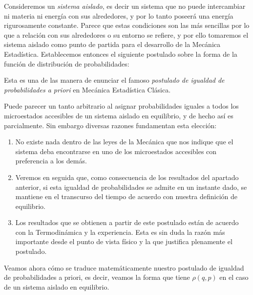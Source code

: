 Consideremos un \emph{sistema aislado}, es decir un sistema que no puede intercambiar ni materia ni energía con sus alrededores, y por lo tanto poseerá una energía rigurosamente constante.
Parece que estas condiciones son las más sencillas por lo que a relación con sus alrededores o su entorno se refiere, y por ello tomaremos el sistema aislado como punto de partida para el desarrollo de la Mecánica Estadística.
Establecemos entonces el siguiente postulado sobre la forma de la función de distribución de probabilidades:
\vspace{-10pt}
\begin{center}
\end{center}
Esta es una de las manera de enunciar el famoso \emph{postulado de igualdad de probabilidades a priori} en Mecánica Estadística Clásica.

Puede parecer un tanto arbitrario al asignar probabilidades iguales a todos los microestados accesibles de un sistema aislado en equilibrio, y de hecho así es parcialmente.
Sin embargo diversas razones fundamentan esta elección:
\begin{enumerate}
	\item No existe nada dentro de las leyes de la Mecánica que nos indique que el sistema deba encontrarse en uno de los microestados accesibles con preferencia a los demás.
	
	\item Veremos en seguida que, como consecuencia de los resultados del apartado anterior, si esta igualdad de probabilidades se admite en un instante dado, se mantiene en el transcurso del tiempo de acuerdo con nuestra definición de equilibrio.
	
	\item Los resultados que se obtienen a partir de este postulado están de acuerdo con la Termodinámica y la experiencia. Esta es sin duda la razón más importante desde el punto de vista físico y la que justifica plenamente el postulado.
\end{enumerate}

Veamos ahora cómo se traduce matemáticamente nuestro postulado de igualdad de probabilidades a priori, es decir, veamos la forma que tiene $\rho(q, p)$ en el caso de un sistema aislado en equilibrio.

